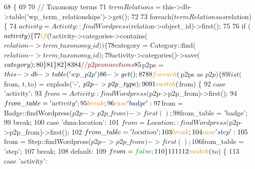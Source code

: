 \begin{DoxyCode}
68     \{  
69 
70         \textcolor{comment}{// Taxonomy terms}
71         $termRelations = $this->db->table(\textcolor{stringliteral}{'wp\_term\_relationships'})->get();
72 
73         \textcolor{keywordflow}{foreach}($termRelations as $relation) \{
74             $activity = Activity::findWordpress($relation->object\_id)->first();
75             
76             \textcolor{keywordflow}{if} ($activity) \{
77                 \textcolor{keywordflow}{if} (!$activity->categories->contains($relation->term\_taxonomy\_id)) \{
78                     $category = Category::find($relation->term\_taxonomy\_id);
79                     $activity->categories()->save($category);
80                 \}
81             \}
82         \}
83 
84         \textcolor{comment}{// p2p connections}
85         $p2ps = $this->db->table(\textcolor{stringliteral}{'wp\_p2p'})
86             ->get();
87 
88         \textcolor{keywordflow}{foreach}($p2ps as $p2p) \{
89             list($from, $t, $to) = explode(\textcolor{charliteral}{'-'}, $p2p->p2p\_type);
90 
91             \textcolor{keywordflow}{switch}($from) \{
92                 \textcolor{keywordflow}{case} \textcolor{stringliteral}{'activity'}:
93                     $from = Activity::findWordpress($p2p->p2p\_from)->first();
94                     $from\_table = \textcolor{stringliteral}{'activity'};
95                     \textcolor{keywordflow}{break};
96                 \textcolor{keywordflow}{case} \textcolor{stringliteral}{'badge'}:
97                     $from = Badge::findWordpress($p2p->p2p\_from)->first();
98                     $from\_table = \textcolor{stringliteral}{'badge'};
99                     \textcolor{keywordflow}{break};
100                 \textcolor{keywordflow}{case} \textcolor{stringliteral}{'dma-location'}:
101                     $from = Location::findWordpress($p2p->p2p\_from)->first();
102                     $from\_table = \textcolor{stringliteral}{'location'};
103                     \textcolor{keywordflow}{break};
104                 \textcolor{keywordflow}{case} \textcolor{stringliteral}{'step'}:
105                     $from = Step::findWordpress($p2p->p2p\_from)->first();
106                     $from\_table = \textcolor{stringliteral}{'step'};
107                     \textcolor{keywordflow}{break};
108                 \textcolor{keywordflow}{default}:
109                     $from = \textcolor{keyword}{false};
110             \}
111 
112             \textcolor{keywordflow}{switch}($to) \{
113                 \textcolor{keywordflow}{case} \textcolor{stringliteral}{'activity'}:

\end{DoxyCode}
